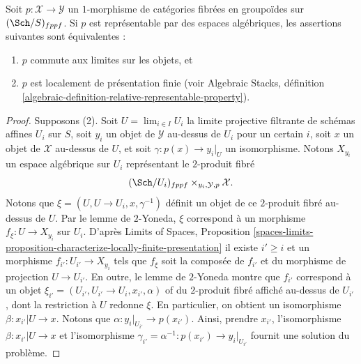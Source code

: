 \begin{lemma}
\label{lemma-representable-by-spaces-limit-preserving}
Soit $p : \mathcal{X} \to \mathcal{Y}$ un $1$-morphisme de catégories
fibrées en groupoïdes sur $(\Sch/S)_{fppf}$. Si $p$ est
représentable par des espaces algébriques, les assertions suivantes sont équivalentes :
\begin{enumerate}
\item $p$ commute aux limites sur les objets, et
\item $p$ est localement de présentation finie (voir
Algebraic Stacks,
définition \ref{algebraic-definition-relative-representable-property}).
\end{enumerate}
\end{lemma}

\begin{proof}
Supposons (2). Soit $U = \lim_{i \in I} U_i$ la limite projective filtrante
de schémas affines $U_i$ sur $S$, soit $y_i$ un objet de $\mathcal{Y}$
au-dessus de $U_i$ pour un certain $i$, soit $x$ un objet de $\mathcal{X}$ au-dessus de $U$,
et soit $\gamma : p(x) \to y_i|_U$ un isomorphisme. Notons
$X_{y_i}$ un espace algébrique sur $U_i$ représentant le $2$-produit
fibré
$$
(\Sch/U_i)_{fppf} \times_{y_i, \mathcal{Y}, p} \mathcal{X}.
$$
Notons que $\xi = (U, U \to U_i, x, \gamma^{-1})$ définit un objet de
ce $2$-produit fibré au-dessus de $U$. Par le lemme de $2$-Yoneda, $\xi$ correspond
à un morphisme $f_\xi : U \to X_{y_i}$ sur $U_i$. D'après
Limits of Spaces, Proposition
\ref{spaces-limits-proposition-characterize-locally-finite-presentation}
il existe $i' \geq i$ et un morphisme $f_{i'} : U_{i'} \to X_{y_i}$
tels que $f_\xi$ soit la composée de $f_{i'}$ et du morphisme de
projection $U \to U_{i'}$. En outre, le lemme de $2$-Yoneda montre que
$f_{i'}$ correspond à un objet
$\xi_{i'} = (U_{i'}, U_{i'} \to U_i, x_{i'}, \alpha)$ of
du $2$-produit fibré affiché au-dessus de $U_{i'}$, dont la restriction à
$U$ redonne $\xi$. En particulier, on obtient un isomorphisme
$\beta : x_{i'}|U \to x$. Notons que $\alpha : y_i|_{U_{i'}} \to p(x_{i'})$.
Ainsi, prendre $x_{i'}$, l'isomorphisme
$\beta : x_{i'}|U \to x$ et l'isomorphisme
$\gamma_{i'} = \alpha^{-1} : p(x_{i'}) \to y_i|_{U_{i'}}$
fournit une solution du problème.


\end{proof}
